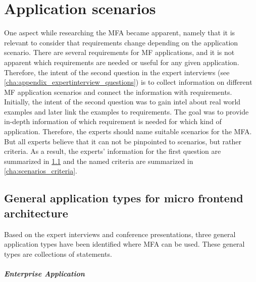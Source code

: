 
\chapter{Application scenarios}\label{cha:scenarios}

One aspect while researching the \ac{MFA} became apparent, namely that it is relevant to consider that requirements change depending on the application scenario.
There are several requirements for \ac{MF} applications, and it is not apparent which requirements are needed or useful for any given application.
Therefore, the intent of the second question in the expert  interviews (see \ref{cha:appendix_expertinterview_questions}) is to collect information on different \ac{MF} application scenarios and connect the information with requirements.
Initially, the intent of the second question was to gain intel about real world examples and later link the examples to requirements.
The goal was to provide in-depth information of which requirement is needed for which kind of application.
Therefore, the experts should name suitable scenarios for the \ac{MFA}.
But all experts believe that it can not be pinpointed to scenarios, but rather criteria.
As a result, the experts' information for the first question are summarized in \ref{cha:scenarios_types} and the named criteria are summarized in \ref{cha:scenarios_criteria}.





\section{General application types for micro frontend architecture}\label{cha:scenarios_types}

Based on the expert interviews and conference presentations, three general application types have been identified where \ac{MFA} can be used.
These general types are collections of statements.



\paragraph{Enterprise Application}\label{cha:scenarios_enterprise}

